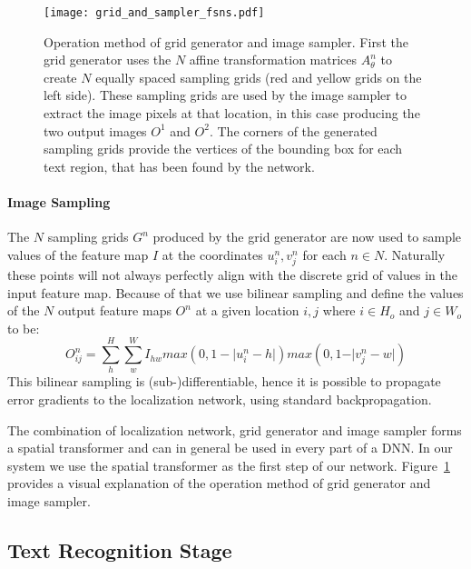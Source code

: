 \documentclass[letterpaper]{article}
\begin{document}
	\begin{figure}[t]
		\centering
		\texttt{[image: grid\_and\_sampler\_fsns.pdf]}
		\caption{Operation method of grid generator and image sampler. First the grid generator uses the $N$ affine transformation matrices $A^{n}_{\theta}$ to create $N$ equally spaced sampling grids (red and yellow grids on the left side). These sampling grids are used by the image sampler to extract the image pixels at that location, in this case producing the two output images $O^1$ and $O^2$. The corners of the generated sampling grids provide the vertices of the bounding box for each text region, that has been found by the network.}
		\label{fig:transformation_params_overview}
	\end{figure}

	\paragraph{Image Sampling}
		The $N$ sampling grids $G^n$ produced by the grid generator are now used to sample values of the feature map $I$ at the coordinates $u^n_{i},v^n_{j}$ for each $n \in N$. Naturally these points will not always perfectly align with the discrete grid of values in the input feature map.
		Because of that we use bilinear sampling and define the values of the $N$ output feature maps $O^n$ at a given location $i,j$ where $i \in H_o$ and $j \in W_o$ to be:
		\begin{equation}
			O^n_{ij} = \sum^{H}_h \sum^{W}_w I_{hw} max(0, 1 - \lvert u^n_{i} - h \rvert) max(0, 1 - \rvert v^n_{j} - w \rvert)
		\end{equation}
		This bilinear sampling is (sub-)differentiable, hence it is possible to propagate error gradients to the localization network, using standard backpropagation.

	The combination of localization network, grid generator and image sampler forms a spatial transformer and can in general be used in every part of a \ac{DNN}.
	In our system we use the spatial transformer as the first step of our network.
	Figure~\ref{fig:transformation_params_overview} provides a visual explanation of the operation method of grid generator and image sampler.


	\subsection{Text Recognition Stage}
\end{document}

